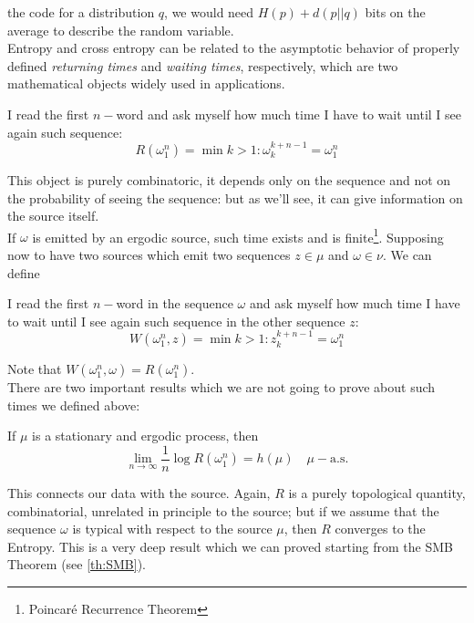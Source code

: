 the code for a distribution $q$, we would need $H (p) + d(p||q)$ bits on the
average to describe the random variable.
\\Entropy and cross entropy can be related to the asymptotic behavior of properly defined \textit{returning times} and \textit{waiting times}, respectively, which are two mathematical objects widely used in applications. 
\begin{definition}
    \hfill
    I read the first $n-$word and ask myself how much time I have to wait until I see again such sequence:
    \begin{equation}
        R(\omega_1^n) = \min{k>1: \omega_k^{k+n-1} = \omega_1^n}
    \end{equation}
\end{definition}
This object is purely combinatoric, it depends only on the sequence and not on the probability of seeing the sequence: but as we'll see, it can give information on the source itself. 
\\If $\omega$ is emitted by an ergodic source, such time exists and is finite\footnote{Poincaré Recurrence Theorem}. 
Supposing now to have two sources which emit two sequences $z \in \mu$ and $\omega \in \nu$. We can define
\begin{definition}
    \hfill
    I read the first $n-$word in the sequence $\omega$ and ask myself how much time I have to wait until I see again such sequence in the other sequence $z$:
    \begin{equation}
        W(\omega_1^n, z) = \min{k>1: z_k^{k+n-1} = \omega_1^n}
    \end{equation}
\end{definition}
Note that $W(\omega_1^n, \omega) = R(\omega_1^n)$.
\\There are two important results which we are not going to prove about such times we defined above: 
\begin{theorem}
If $\mu$ is a stationary and ergodic process, then 
\begin{equation}
    \lim_{n \rightarrow \infty} \frac{1}{n} \log R(\omega_1^n) = h(\mu) \quad \mu-\text{a.s.}
\end{equation}
\end{theorem}
This connects our data with the source. Again, $R$ is a purely topological quantity, combinatorial, unrelated in principle to the source; but if we assume that the sequence $\omega$ is typical with respect to the source $\mu$, then $R$ converges to the Entropy. This is a very deep result which we can proved starting from the SMB Theorem (see \ref{th:SMB}). 
